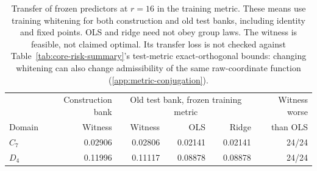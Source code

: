 \begin{table}[t]
\centering\small
\begin{tabular}{@{}lrrrrr@{}}
\toprule
& Construction bank & \multicolumn{3}{c}{Old test bank, frozen training metric} & Witness worse \\
Domain & Witness & Witness & OLS & Ridge & than OLS \\
\midrule
$C_7$ & 0.02906 & 0.02806 & 0.02141 & 0.02141 & 24/24 \\
$D_4$ & 0.11996 & 0.11117 & 0.08878 & 0.08878 & 24/24 \\
\bottomrule
\end{tabular}
\caption{Transfer of frozen predictors at $r=16$ in the training metric. These means use training whitening for both construction and old test banks, including identity and fixed points. OLS and ridge need not obey group laws. The witness is feasible, not claimed optimal. Its transfer loss is not checked against Table~\ref{tab:core-risk-summary}'s test-metric exact-orthogonal bounds: changing whitening can also change admissibility of the same raw-coordinate function (\cref{app:metric-conjugation}).}
\label{tab:followup-witness}
\end{table}
